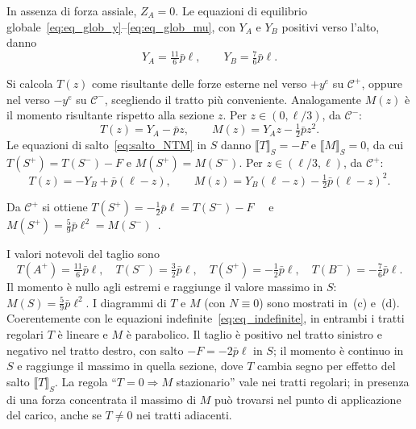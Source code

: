 \begin{esempio}
\begin{svolgimento}
		In assenza di forza assiale, $Z_A = 0$. Le equazioni di
		equilibrio globale~\eqref{eq:eq_glob_y}--\eqref{eq:eq_glob_mu},
		con $Y_A$ e $Y_B$ positivi verso l'alto, danno
		\begin{equation*}
			Y_A = \tfrac{11}{6}\bar p\ell, \qquad
			Y_B = \tfrac{7}{6}\bar p\ell.
		\end{equation*}
		



		Si calcola $T(z)$ come risultante delle forze esterne nel
		verso $+y^e$ su $\mathcal C^+$, oppure nel verso $-y^e$
		su $\mathcal C^-$, scegliendo il tratto più conveniente.
		Analogamente $M(z)$ è il momento risultante rispetto alla
		sezione $z$. Per $z \in (0,\ell/3)$, da $\mathcal C^-$:
		\begin{equation*}
			T(z) = Y_A - \bar p z, \qquad
			M(z) = Y_A z - \tfrac{1}{2}\bar p z^2.
		\end{equation*}
		Le equazioni di salto~\eqref{eq:salto_NTM} in $S$ danno
		$\llbracket T \rrbracket_S = -F$ e
		$\llbracket M \rrbracket_S = 0$, da cui
		$T(S^+) = T(S^-) - F$ e $M(S^+) = M(S^-)$.
		Per $z \in (\ell/3,\ell)$, da $\mathcal C^+$:
		\begin{equation*}
			T(z) = -Y_B + \bar p(\ell - z), \qquad
			M(z) = Y_B(\ell - z) - \tfrac{1}{2}\bar p(\ell - z)^2.
		\end{equation*}
		
		Da $\mathcal C^+$ si ottiene
		$T(S^+) = -\tfrac{1}{2}\bar p\ell = T(S^-) - F$~\checkmark
		\ e $M(S^+) = \tfrac{5}{9}\bar p\ell^2 = M(S^-)$~\checkmark.
		
		I valori notevoli del taglio sono
		\begin{equation*}
			T(A^+) = \tfrac{11}{6}\bar p\ell, \quad
			T(S^-) = \tfrac{3}{2}\bar p\ell, \quad
			T(S^+) = -\tfrac{1}{2}\bar p\ell, \quad
			T(B^-) = -\tfrac{7}{6}\bar p\ell.
		\end{equation*}
		Il momento è nullo agli estremi e raggiunge il valore
		massimo in $S$:
		$M(S) = \tfrac{5}{9}\bar p\ell^2$.
		I diagrammi di $T$ e $M$ (con $N \equiv 0$) sono mostrati
		in \,(c) e
		\,(d).
		Coerentemente con le equazioni
		indefinite~\eqref{eq:eq_indefinite}, in entrambi i tratti
		regolari $T$ è lineare e $M$ è parabolico. Il taglio è
		positivo nel tratto sinistro e negativo nel tratto destro,
		con salto $-F = -2\bar p\ell$ in $S$; il momento è continuo
		in $S$ e raggiunge il massimo in quella sezione, dove $T$
		cambia segno per effetto del salto $\llbracket T\rrbracket_S$.
		La regola ``$T = 0 \Rightarrow M$ stazionario'' vale nei
		tratti regolari; in presenza di una forza concentrata
		il massimo di $M$ può trovarsi nel punto di applicazione
		del carico, anche se $T \neq 0$ nei tratti adiacenti.
		
	\end{svolgimento}
\end{esempio}




